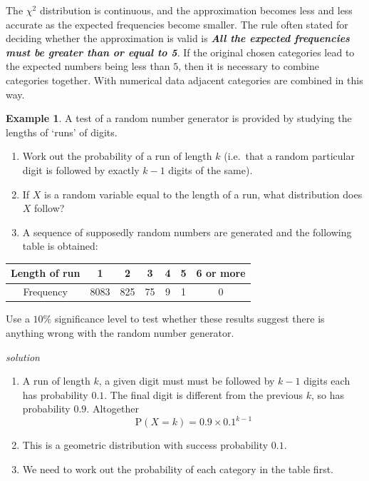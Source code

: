 \documentclass[
]{book}
\theoremstyle{definition}
\theoremstyle{definition}
\newtheorem{example}{Example}[chapter]
\theoremstyle{definition}
\theoremstyle{definition}
\theoremstyle{remark}
\begin{document}
The \(\chi^2\) distribution is continuous, and the approximation becomes less and less accurate as the expected frequencies become smaller. The rule often stated for deciding whether the approximation is valid is \textbf{\emph{All the expected frequencies must be greater than or equal to 5}}. If the original chosen categories lead to the expected numbers being less than \(5\), then it is necessary to combine categories together. With numerical data adjacent categories are combined in this way.

\begin{example}
A test of a random number generator is provided by studying the lengths of `runs' of digits.

\begin{enumerate}
\def\labelenumi{\alph{enumi})}
\item
  Work out the probability of a run of length \(k\) (i.e.~that a random particular digit is followed by exactly \(k-1\) digits of the same).
\item
  If \(X\) is a random variable equal to the length of a run, what distribution does \(X\) follow?
\item
  A sequence of supposedly random numbers are generated and the following table is obtained:
\end{enumerate}

\begin{longtable}[]{@{}ccccccc@{}}
\toprule
Length of run & 1 & 2 & 3 & 4 & 5 & 6 or more\tabularnewline
\midrule
\endhead
Frequency & 8083 & 825 & 75 & 9 & 1 & 0\tabularnewline
\bottomrule
\end{longtable}

Use a \(10\%\) significance level to test whether these results suggest there is anything wrong with the random number generator.
\end{example}

\emph{solution}

\begin{enumerate}
\def\labelenumi{\alph{enumi})}
\item
  A run of length \(k\), a given digit must must be followed by \(k-1\) digits each has probability \(0.1\). The final digit is different from the previous \(k\), so has probability \(0.9\). Altogether
  \[ \text{P}(X=k) = 0.9\times 0.1^{k-1}\]
\item
  This is a geometric distribution with success probability \(0.1\).
\item
  We need to work out the probability of each category in the table first.
\end{enumerate}
\end{document}
